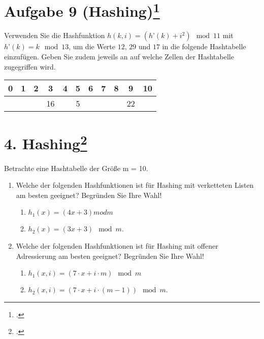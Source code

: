 \documentclass{lehramt-informatik}
\begin{document}
\section{Aufgabe 9 (Hashing)\footcite{examen:66115:2019:09}}

Verwenden Sie die Hashfunktion $h(k,i) = (h’(k) + i^2) \mod 11$ mit
$h’(k) = k \mod 13$, um die Werte $12$, $29$ und $17$ in die folgende
Hashtabelle einzufügen. Geben Sie zudem jeweils an auf welche Zellen der
Hashtabelle zugegriffen wird.

\begin{center}
\begin{tabular}{|c|c|c|c|c|c|c|c|c|c|c|}
\hline
0&1&2&3&4&5&6&7&8&9&10\\\hline
&&&16&&5&&&&22&\\\hline
\end{tabular}
\end{center}

%

\section{4. Hashing\footcite[Seite 7]{examen:66115:2016:03}}

Betrachte eine Hashtabelle der Größe m = 10.

\begin{enumerate}


\item Welche der folgenden Hashfunktionen ist für Hashing mit
verketteten Listen am besten geeignet? Begründen Sie Ihre Wahl!

\begin{enumerate}
\item $h_1(x) = (4x + 3) mod m$
\item $h_2(x) = (3x + 3) \mod m$.
\end{enumerate}


\item Welche der folgenden Hashfunktionen ist für Hashing mit offener
Adressierung am besten geeignet? Begründen Sie Ihre Wahl!

\begin{enumerate}
\item $h_1(x,i) = (7 \cdot x + i \cdot m) \mod m$
\item $h_2(x,i) = (7 \cdot x + i \cdot (m - 1)) \mod m$.
\end{enumerate}
\end{enumerate}
\end{document}
